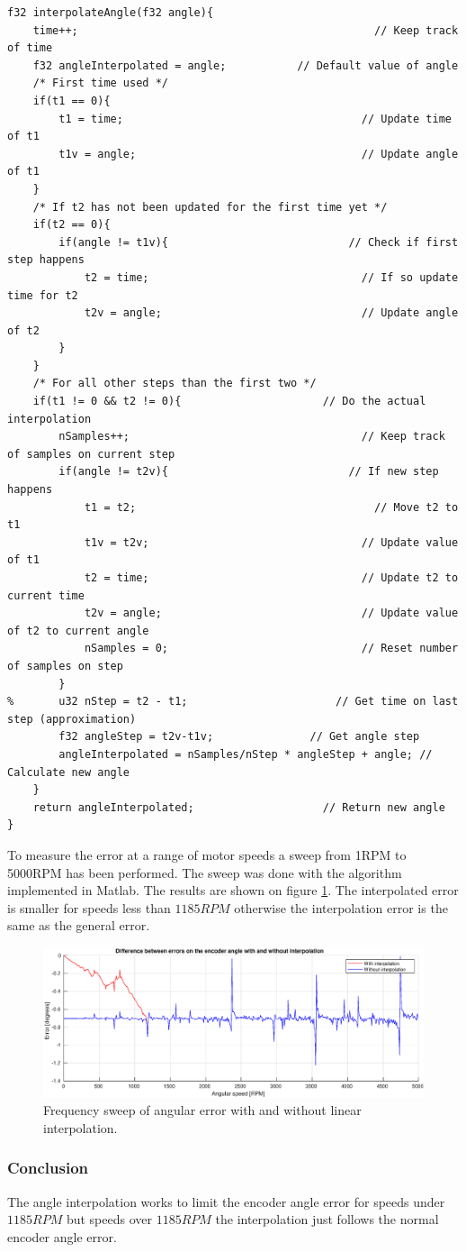 \begin{lstlisting}[style=c, caption=Interpolation algorithm implemented on the embedded system., label=code:interpolation_algorithm]
f32 interpolateAngle(f32 angle){
	time++;								                 // Keep track of time
	f32 angleInterpolated = angle;		     // Default value of angle
	/* First time used */
	if(t1 == 0){
		t1 = time;						               // Update time of t1
		t1v = angle;					               // Update angle of t1
	}
	/* If t2 has not been updated for the first time yet */
	if(t2 == 0){
		if(angle != t1v){				             // Check if first step happens
			t2 = time;					               // If so update time for t2
			t2v = angle;				               // Update angle of t2
		}
	}
	/* For all other steps than the first two */
	if(t1 != 0 && t2 != 0){				         // Do the actual interpolation
		nSamples++;						               // Keep track of samples on current step
		if(angle != t2v){				             // If new step happens
			t1 = t2;					                 // Move t2 to t1
			t1v = t2v;					               // Update value of t1
			t2 = time;					               // Update t2 to current time
			t2v = angle;				               // Update value of t2 to current angle
			nSamples = 0;				               // Reset number of samples on step
		}
% 		u32 nStep = t2 - t1;				       // Get time on last step (approximation)
		f32 angleStep = t2v-t1v;	           // Get angle step
		angleInterpolated = nSamples/nStep * angleStep + angle; // Calculate new angle
	}
	return angleInterpolated;			         // Return new angle
}
\end{lstlisting}

To measure the error at a range of motor speeds a sweep from 1RPM to 5000RPM has been performed. The sweep was done with the algorithm implemented in Matlab. The results are shown on figure \ref{fig:interpolation_error}. The interpolated error is smaller for speeds less than $1185RPM$ otherwise the interpolation error is the same as the general error.


\begin{figure}[H]
	\centering
	\includegraphics[width=1\textwidth]{pictures/software/interpolation_error.eps}
	\caption{Frequency sweep of angular error with and without linear interpolation.}
	\label{fig:interpolation_error}
\end{figure}


\subsubsection*{Conclusion}
The angle interpolation works to limit the encoder angle error for speeds under $1185RPM$ but speeds over $1185RPM$ the interpolation just follows the normal encoder angle error.